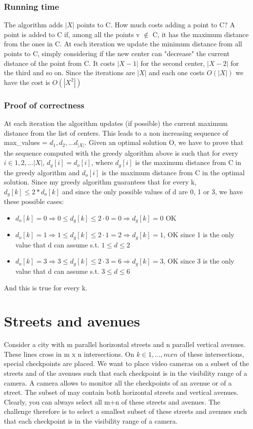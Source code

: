 \documentclass[12pt]{article}
\begin{document}
\subsubsection{Running time}
The algorithm adds $|X|$ points to C. How much costs adding a point to C? A point is added to C if, among all the points v $\notin$ C, it has the maximum distance from the ones in C. At each iteration we update the minimum distance from all points to C, simply considering if the new center can "decrease" the current distance of the point from C. It costs $|X - 1|$ for the second center, $|X - 2|$ for the third and so on. Since the iterations are $|X|$ and each one costs $O(|X|)$ we have the cost is $O(|X^2|)$
\subsubsection{Proof of correctness}
At each iteration the algorithm updates (if possible) the current maximum distance from the list of centers. This leads to a non increasing sequence of max\_values = ${d_1, d_2, ... d_{|X|}}$. Given an optimal solution O, we have to prove that the sequence computed with the greedy algorithm above is such that for every $i \in {1, 2, ... |X|}$, $d_g[i] = d_o[i] $, where $d_g[i]$ is the maximum distance from C in the greedy algorithm and $d_o[i]$ is the maximum distance from C in the optimal solution. Since my greedy algorithm guarantees that for every k, $d_g[k] \leq 2* d_o[k]$ and since the only possible values of d are 0, 1 or 3, we have these possible cases:
\begin{itemize}
	\item $d_o[k] = 0 \Rightarrow  0 \leq d_g[k] \leq 2\cdot0 = 0 \Rightarrow d_g[k] = 0$ OK
	\item $d_o[k] = 1 \Rightarrow  1 \leq d_g[k] \leq 2\cdot1 = 2 \Rightarrow d_g[k] = 1 $, OK since 1 is the only value that d can assume s.t. $1 \leq d \leq 2$
	\item $d_o[k] = 3 \Rightarrow  3 \leq d_g[k] \leq 2\cdot3 = 6 \Rightarrow d_g[k] = 3 $, OK since 3 is the only value that d can assume s.t. $3 \leq d \leq 6$
\end{itemize}
And this is true for every k.

\section{Streets and avenues}
Consider a city with m parallel horizontal streets and n parallel vertical avenues.
These lines cross in m x n intersections. On $k \in {1, ... ,m x n}$ of these intersections, special checkpoints are placed. We want to place video cameras on a subset of the streets and of the avenues such that each checkpoint is in the visibility range of a camera. A camera allows to monitor all the checkpoints of an avenue or of a street. The subset of may contain both
horizontal streets and vertical avenues. Clearly, you can always select all m+n of these streets and avenues. The challenge therefore is to select a smallest subset of these streets and avenues such that each checkpoint is in the visibility range of a camera.
\end{document}
